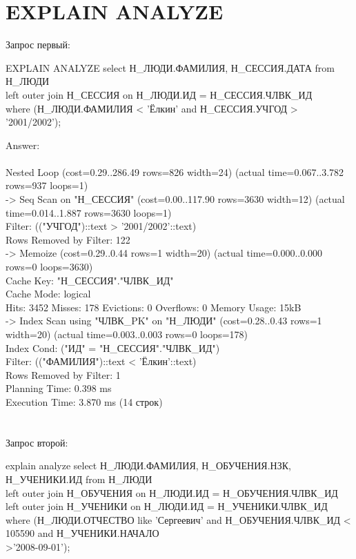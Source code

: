\documentclass{article}
\begin{document}
\section{EXPLAIN ANALYZE}
Запрос первый:
\begin{center}
    EXPLAIN ANALYZE select Н\_ЛЮДИ.ФАМИЛИЯ, Н\_СЕССИЯ.ДАТА from Н\_ЛЮДИ\\
left outer join Н\_СЕССИЯ on Н\_ЛЮДИ.ИД = Н\_СЕССИЯ.ЧЛВК\_ИД\\
where (Н\_ЛЮДИ.ФАМИЛИЯ < 'Ёлкин' and Н\_СЕССИЯ.УЧГОД > '2001/2002');
\end{center}
Answer:\\
\\
    Nested Loop  (cost=0.29..286.49 rows=826 width=24) (actual time=0.067..3.782 rows=937 loops=1)
    \\->  Seq Scan on "Н\_СЕССИЯ"  (cost=0.00..117.90 rows=3630 width=12) (actual time=0.014..1.887 rows=3630 loops=1)
         \\ Filter: (("УЧГОД")::text > '2001/2002'::text)
          \\Rows Removed by Filter: 122
    \\->  Memoize  (cost=0.29..0.44 rows=1 width=20) (actual time=0.000..0.000 rows=0 loops=3630)
         \\ Cache Key: "Н\_СЕССИЯ"."ЧЛВК\_ИД"
        \\  Cache Mode: logical
        \\  Hits: 3452  Misses: 178  Evictions: 0  Overflows: 0  Memory Usage: 15kB
        \\  ->  Index Scan using "ЧЛВК\_PK" on "Н\_ЛЮДИ"  (cost=0.28..0.43 rows=1 width=20) (actual time=0.003..0.003 rows=0 loops=178)
         \\       Index Cond: ("ИД" = "Н\_СЕССИЯ"."ЧЛВК\_ИД")
          \\      Filter: (("ФАМИЛИЯ")::text < 'Ёлкин'::text)
           \\     Rows Removed by Filter: 1
  \\Planning Time: 0.398 ms
  \\Execution Time: 3.870 ms
 (14 строк)\\
 \\ \\
 Запрос второй:
 \begin{center}
    explain analyze select Н\_ЛЮДИ.ФАМИЛИЯ, Н\_ОБУЧЕНИЯ.НЗК, Н\_УЧЕНИКИ.ИД from Н\_ЛЮДИ
    \\left outer join Н\_ОБУЧЕНИЯ on Н\_ЛЮДИ.ИД = Н\_ОБУЧЕНИЯ.ЧЛВК\_ИД
    \\left outer join Н\_УЧЕНИКИ on Н\_ЛЮДИ.ИД = Н\_УЧЕНИКИ.ЧЛВК\_ИД
    \\where (Н\_ЛЮДИ.ОТЧЕСТВО like 'Сергеевич' and Н\_ОБУЧЕНИЯ.ЧЛВК\_ИД < 105590 and Н\_УЧЕНИКИ.НАЧАЛО
    \\>'2008-09-01');
 \end{center}
\end{document}
